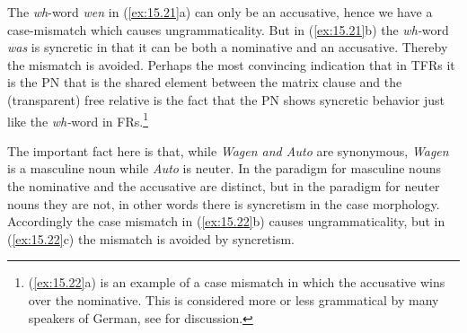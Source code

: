 \documentclass[output=paper]{langsci/langscibook}
\begin{document}
\begin{refcontext}
\ea\label{ex:15.21}
    \z
\z
The \emph{wh}{}-word \emph{wen} in (\ref{ex:15.21}a) can only be an accusative, hence we
have a case-mismatch which causes ungrammaticality. But in (\ref{ex:15.21}b) the
\emph{wh-}word \emph{was} is syncretic in that it can be both a nominative and
an accusative. Thereby the mismatch is avoided. Perhaps the most convincing
indication that in \glspl{TFR} it is the \gls{PN} that is the shared element
between the matrix clause and the (transparent) free relative is the fact
that the \gls{PN} shows syncretic behavior just like the \emph{wh-}word in
\glspl{FR}.\footnote{(\ref{ex:15.22}a) is an example of a case mismatch in which the
    accusative wins over the nominative. This is considered more or less
    grammatical by many speakers of German, see \citet{Vogel2001} for
discussion.}

\ea\label{ex:15.22}
    \z
\z
The important fact here is that, while \emph{Wagen and Auto} are synonymous,
\emph{Wagen} is a masculine noun while \emph{Auto} is neuter. In the paradigm
for masculine nouns the nominative and the accusative are distinct, but in the
paradigm for neuter nouns they are not, in other words there is syncretism in
the case morphology. Accordingly the case mismatch in (\ref{ex:15.22}b) causes
ungrammaticality, but in (\ref{ex:15.22}c) the mismatch is avoided by syncretism.


\end{refcontext}
\end{document}
